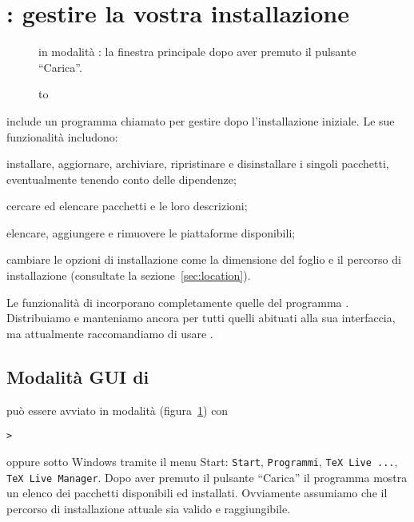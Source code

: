 \documentclass{article}
\begin{document}
\section{: gestire la vostra installazione}
\label{sec:tlmgr}

\begin{figure}[tb]
\caption{ in modalità \GUI: la finestra principale dopo aver
  premuto il pulsante ``Carica''.}\label{fig:tlmgr-gui}
\end{figure}

\begin{figure}[tb]
\hbox to 
\end{figure}

\TL{} include un programma chiamato  per gestire \TL{} dopo
l'installazione iniziale. Le sue funzionalità includono:

\begin{itemize*}
\item installare, aggiornare, archiviare, ripristinare e disinstallare i
  singoli pacchetti, eventualmente tenendo conto delle dipendenze;
\item cercare ed elencare pacchetti e le loro descrizioni;
\item elencare, aggiungere e rimuovere le piattaforme disponibili;
\item cambiare le opzioni di installazione come la dimensione del foglio e
  il percorso di installazione (consultate la sezione~\ref{sec:location}).
\end{itemize*}

Le funzionalità di  incorporano completamente quelle del
programma . Distribuiamo e manteniamo ancora
 per tutti quelli abituati alla sua interfaccia, ma
attualmente raccomandiamo di usare .

\subsection{Modalità GUI di }
 può essere avviato in modalità \GUI{}
(figura~\ref{fig:tlmgr-gui}) con
\begin{alltt}
> 
\end{alltt}
oppure sotto Windows tramite il menu Start: \texttt{Start},
\texttt{Programmi}, \texttt{TeX Live ...}, \texttt{TeX Live Manager}.
Dopo aver premuto il pulsante ``Carica'' il programma mostra un elenco dei
pacchetti disponibili ed installati. Ovviamente assumiamo che il percorso
di installazione attuale sia valido e raggiungibile.
\end{document}
